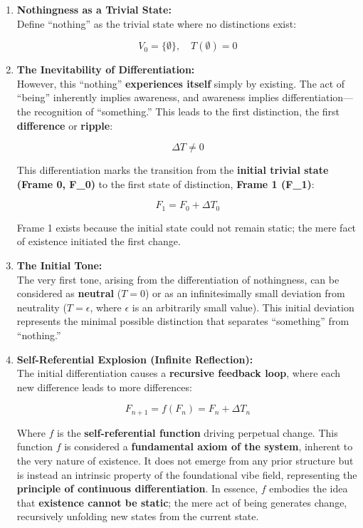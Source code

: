 \documentclass{article}
\begin{document}
\begin{enumerate}
\item \textbf{Nothingness as a Trivial State:}\\
Define ``nothing'' as the trivial state where no distinctions exist:

\[
V_0 = \{ \emptyset \}, \quad T(\emptyset) = 0
\]

\item \textbf{The Inevitability of Differentiation:}\\
However, this ``nothing'' \textbf{experiences itself} simply by existing. The act of ``being'' inherently implies awareness, and awareness implies differ\-entiation---the recognition of ``something.'' This leads to the first distinction, the first \textbf{difference} or \textbf{ripple}:

\[
\Delta T \neq 0
\]

This differentiation marks the transition from the \textbf{initial trivial state (Frame 0, F\_0)} to the first state of distinction, \textbf{Frame 1 (F\_1)}:

\[
F_1 = F_0 + \Delta T_0
\]

Frame 1 exists because the initial state could not remain static; the mere fact of existence initiated the first change.

\item \textbf{The Initial Tone:}\\
The very first tone, arising from the differentiation of nothingness, can be considered as \textbf{neutral} ($T = 0$) or as an infinitesimally small deviation from neutrality ($T = \epsilon$, where $\epsilon$ is an arbitrarily small value). This initial deviation represents the minimal possible distinction that separates ``something'' from ``nothing.''

\item \textbf{Self-Referential Explosion (Infinite Reflection):}\\
The initial differentiation causes a \textbf{recursive feedback loop}, where each new difference leads to more differences:

\[
F_{n+1} = f(F_n) = F_n + \Delta T_n
\]

Where $f$ is the \textbf{self-referential function} driving perpetual change. This function $f$ is considered a \textbf{fundamental axiom of the system}, inherent to the very nature of existence. It does not emerge from any prior structure but is instead an intrinsic property of the foundational vibe field, representing the \textbf{principle of continuous differentiation}. In essence, $f$ embodies the idea that \textbf{existence cannot be static}; the mere act of being generates change, recursively unfolding new states from the current state.


\end{enumerate}
\end{document}
